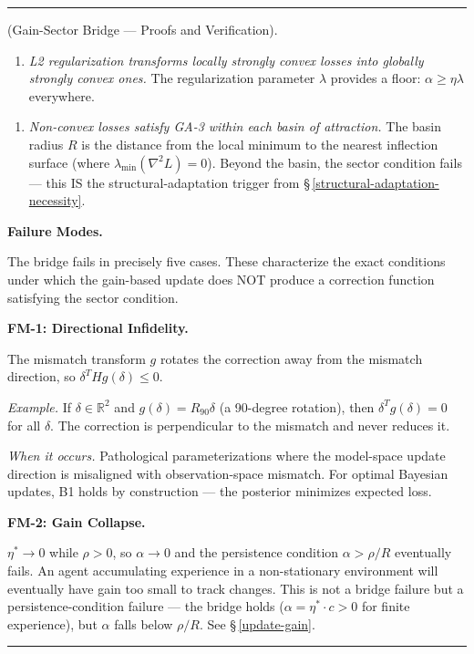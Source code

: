 \documentclass[11pt,oneside]{article}
\newcounter{claim}[section]
\renewcommand{\theclaim}{\thesection.\arabic{claim}}
\newenvironment{segment}[2]{%
  \refstepcounter{claim}%
  \bigskip\noindent\hrule\smallskip
  \noindent{\bfseries #1~\theclaim}\enskip(#2).\par\smallskip
  \noindent\ignorespaces
}{%
  \par\smallskip\noindent\hrule\bigskip
}
\newenvironment{derivation}[1][]{\begin{segment}{Derivation}{#1}}{\end{segment}}
\begin{document}
\begin{derivation}[Gain-Sector Bridge — Proofs and Verification]
\begin{enumerate}
  \item \textit{L2 regularization transforms locally strongly convex losses into globally strongly convex ones.} The regularization parameter $\lambda$ provides a floor: $\alpha \geq \eta \lambda$ everywhere.
\end{enumerate}


\begin{enumerate}
  \item \textit{Non-convex losses satisfy GA-3 within each basin of attraction.} The basin radius $R$ is the distance from the local minimum to the nearest inflection surface (where $\lambda_{\min}(\nabla^2 L) = 0$). Beyond the basin, the sector condition fails — this IS the structural-adaptation trigger from \S\,\ref{structural-adaptation-necessity}.
\end{enumerate}




\medskip\noindent\textbf{Failure Modes.}


The bridge fails in precisely five cases. These characterize the exact conditions under which the gain-based update does NOT produce a correction function satisfying the sector condition.


\medskip\noindent\textbf{FM-1: Directional Infidelity.}


The mismatch transform $g$ rotates the correction away from the mismatch direction, so $\delta^T H g(\delta) \leq 0$.

\textit{Example.} If $\delta \in \mathbb{R}^2$ and $g(\delta) = R_{90}\delta$ (a 90-degree rotation), then $\delta^T g(\delta) = 0$ for all $\delta$. The correction is perpendicular to the mismatch and never reduces it.

\textit{When it occurs.} Pathological parameterizations where the model-space update direction is misaligned with observation-space mismatch. For optimal Bayesian updates, B1 holds by construction — the posterior minimizes expected loss.


\medskip\noindent\textbf{FM-2: Gain Collapse.}


$\eta^* \to 0$ while $\rho > 0$, so $\alpha \to 0$ and the persistence condition $\alpha > \rho/R$ eventually fails. An agent accumulating experience in a non-stationary environment will eventually have gain too small to track changes. This is not a bridge failure but a persistence-condition failure — the bridge holds ($\alpha = \eta^* \cdot c > 0$ for finite experience), but $\alpha$ falls below $\rho/R$. See \S\,\ref{update-gain}.



\end{derivation}
\end{document}
